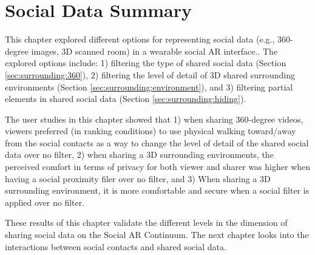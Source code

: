 \pagebreak
\section{Social Data Summary}

This chapter explored different options for representing social data (e.g., 360-degree images, 3D scanned room) in a wearable social AR interface.. The explored options include: 1) filtering the type of shared social data (Section \ref{sec:surrounding:360}), 2) filtering the level of detail of 3D shared surrounding environments (Section \ref{sec:surrounding:environment}), and 3) filtering partial elements in shared social data (Section \ref{sec:surrounding:hiding}). 

The user studies in this chapter showed that 1) when sharing 360-degree videos, viewers preferred (in ranking conditions) to use physical walking toward/away from the social contacts as a way to change the level of detail of the shared social data over no filter, 2) when sharing a 3D surrounding environments, the perceived comfort in terms of privacy for both viewer and sharer was higher when having a social proximity filer over no filter, and 3)  When sharing a 3D surrounding environment, it is more comfortable and secure when a social filter is applied over no filter.

These results of this chapter validate the different levels in the dimension of sharing social data on the Social AR Continuum. The next chapter looks into the interactions between social contacts and shared social data. 